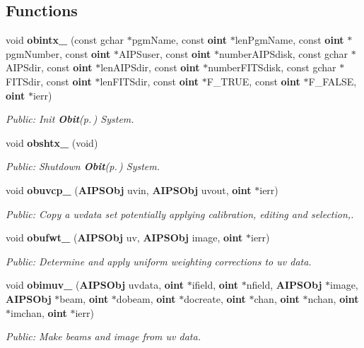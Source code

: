 \subsection*{Functions}
\begin{CompactItemize}
\item 
void {\bf obintx\_\-} (const gchar $\ast$pgm\-Name, const {\bf oint} $\ast$len\-Pgm\-Name, const {\bf oint} $\ast$pgm\-Number, const {\bf oint} $\ast$AIPSuser, const {\bf oint} $\ast$number\-AIPSdisk, const gchar $\ast$AIPSdir, const {\bf oint} $\ast$len\-AIPSdir, const {\bf oint} $\ast$number\-FITSdisk, const gchar $\ast$FITSdir, const {\bf oint} $\ast$len\-FITSdir, const {\bf oint} $\ast$F\_\-TRUE, const {\bf oint} $\ast$F\_\-FALSE, {\bf oint} $\ast$ierr)
\begin{CompactList}\small\item\em Public: Init {\bf Obit}{\rm (p.\,\pageref{structObit})} System. \item\end{CompactList}\item 
void {\bf obshtx\_\-} (void)
\begin{CompactList}\small\item\em Public: Shutdown {\bf Obit}{\rm (p.\,\pageref{structObit})} System. \item\end{CompactList}\item 
void {\bf obuvcp\_\-} ({\bf AIPSObj} uvin, {\bf AIPSObj} uvout, {\bf oint} $\ast$ierr)
\begin{CompactList}\small\item\em Public: Copy a uvdata set potentially applying calibration, editing and selection,. \item\end{CompactList}\item 
void {\bf obufwt\_\-} ({\bf AIPSObj} uv, {\bf AIPSObj} image, {\bf oint} $\ast$ierr)
\begin{CompactList}\small\item\em Public: Determine and apply uniform weighting corrections to uv data. \item\end{CompactList}\item 
void {\bf obimuv\_\-} ({\bf AIPSObj} uvdata, {\bf oint} $\ast$ifield, {\bf oint} $\ast$nfield, {\bf AIPSObj} $\ast$image, {\bf AIPSObj} $\ast$beam, {\bf oint} $\ast$dobeam, {\bf oint} $\ast$docreate, {\bf oint} $\ast$chan, {\bf oint} $\ast$nchan, {\bf oint} $\ast$imchan, {\bf oint} $\ast$ierr)
\begin{CompactList}\small\item\em Public: Make beams and image from uv data. \item\end{CompactList}\item 

\end{CompactItemize}

